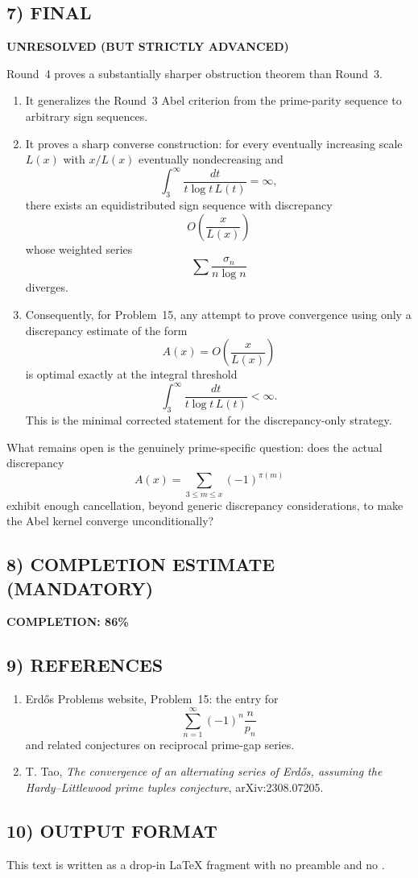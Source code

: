 \subsection*{7) FINAL}

\textbf{UNRESOLVED (BUT STRICTLY ADVANCED)}

Round~4 proves a substantially sharper obstruction theorem than Round~3.

\begin{enumerate}
\item It generalizes the Round~3 Abel criterion from the prime-parity sequence to arbitrary sign sequences.

\item It proves a sharp converse construction: for every eventually increasing scale $L(x)$ with $x/L(x)$ eventually nondecreasing and
\[
\int_3^\infty \frac{dt}{t\log t\,L(t)}=\infty,
\]
there exists an equidistributed sign sequence with discrepancy
\[
O\!\left(\frac{x}{L(x)}\right)
\]
whose weighted series
\[
\sum \frac{\sigma_n}{n\log n}
\]
diverges.

\item Consequently, for Problem~15, any attempt to prove convergence using only a discrepancy estimate of the form
\[
A(x)=O\!\left(\frac{x}{L(x)}\right)
\]
is optimal exactly at the integral threshold
\[
\int_3^\infty \frac{dt}{t\log t\,L(t)}<\infty.
\]
This is the minimal corrected statement for the discrepancy-only strategy.
\end{enumerate}

What remains open is the genuinely prime-specific question: does the actual discrepancy
\[
A(x)=\sum_{3\le m\le x}(-1)^{\pi(m)}
\]
exhibit enough cancellation, beyond generic discrepancy considerations, to make the Abel kernel converge unconditionally?

\subsection*{8) COMPLETION ESTIMATE (MANDATORY)}

\textbf{COMPLETION: 86\%}

\subsection*{9) REFERENCES}

\begin{enumerate}
\item[{[EP]}] Erd\H{o}s Problems website, Problem~15: the entry for
\[
\sum_{n=1}^\infty (-1)^n\frac{n}{p_n}
\]
and related conjectures on reciprocal prime-gap series.

\item[{[Ta23]}] T. Tao,
\emph{The convergence of an alternating series of Erd\H{o}s, assuming the Hardy--Littlewood prime tuples conjecture},
arXiv:2308.07205.
\end{enumerate}

\subsection*{10) OUTPUT FORMAT}

This text is written as a drop-in \LaTeX{} fragment with no preamble and no \verb||.
